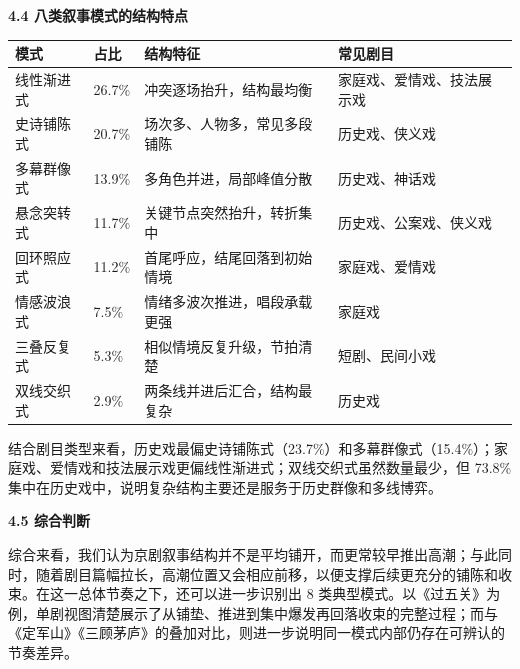 \documentclass[12pt, a4paper]{article}
\begin{document}
{\fontsize{13bp}{18bp}\heiti\bfseries 4.4 八类叙事模式的结构特点}

\vspace{4pt}

{\fontsize{10.5bp}{15bp}\selectfont
\renewcommand{\arraystretch}{1.23}
\begin{center}
\begin{tabular}{C{0.18\textwidth} C{0.12\textwidth} L{0.25\textwidth} L{0.22\textwidth}}
\toprule
模式 & 占比 & 结构特征 & 常见剧目 \tabularnewline
\midrule
线性渐进式 & 26.7\% & 冲突逐场抬升，结构最均衡 & 家庭戏、爱情戏、技法展示戏 \tabularnewline
史诗铺陈式 & 20.7\% & 场次多、人物多，常见多段铺陈 & 历史戏、侠义戏 \tabularnewline
多幕群像式 & 13.9\% & 多角色并进，局部峰值分散 & 历史戏、神话戏 \tabularnewline
悬念突转式 & 11.7\% & 关键节点突然抬升，转折集中 & 历史戏、公案戏、侠义戏 \tabularnewline
回环照应式 & 11.2\% & 首尾呼应，结尾回落到初始情境 & 家庭戏、爱情戏 \tabularnewline
情感波浪式 & 7.5\% & 情绪多波次推进，唱段承载更强 & 家庭戏 \tabularnewline
三叠反复式 & 5.3\% & 相似情境反复升级，节拍清楚 & 短剧、民间小戏 \tabularnewline
双线交织式 & 2.9\% & 两条线并进后汇合，结构最复杂 & 历史戏 \tabularnewline
\bottomrule
\end{tabular}
\end{center}
}

{\fontsize{12bp}{20bp}\kaishu
结合剧目类型来看，历史戏最偏史诗铺陈式（23.7\%）和多幕群像式（15.4\%）；家庭戏、爱情戏和技法展示戏更偏线性渐进式；双线交织式虽然数量最少，但 73.8\% 集中在历史戏中，说明复杂结构主要还是服务于历史群像和多线博弈。
}

\vspace{6pt}


{\fontsize{13bp}{18bp}\heiti\bfseries 4.5 综合判断}

\vspace{4pt}

{\fontsize{12bp}{20bp}\kaishu
综合来看，我们认为京剧叙事结构并不是平均铺开，而更常较早推出高潮；与此同时，随着剧目篇幅拉长，高潮位置又会相应前移，以便支撑后续更充分的铺陈和收束。在这一总体节奏之下，还可以进一步识别出 8 类典型模式。以《过五关》为例，单剧视图清楚展示了从铺垫、推进到集中爆发再回落收束的完整过程；而与《定军山》《三顾茅庐》的叠加对比，则进一步说明同一模式内部仍存在可辨认的节奏差异。
}

\vspace{10pt}

\end{document}
